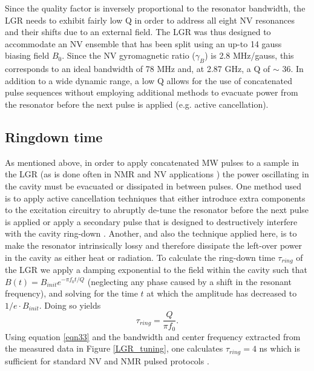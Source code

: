 Since the quality factor is inversely proportional to the resonator bandwidth, the LGR needs to exhibit fairly low Q in order to address all eight NV resonances and their shifts due to an external field. The LGR was thus designed to accommodate an NV ensemble that has been split using an up-to 14 gauss biasing field $B_0$. Since the NV gyromagnetic ratio ($\gamma_B$) is 2.8 MHz/gauss, this corresponds to an ideal bandwidth of 78 MHz and, at 2.87 GHz, a Q of $\sim$ 36. In addition to a wide dynamic range, a low Q allows for the use of concatenated pulse sequences without employing additional methods to evacuate power from the resonator before the next pulse is applied (e.g. active cancellation). 

\subsection{Ringdown time}\label{ringdown}

As mentioned above, in order to apply concatenated MW pulses to a sample in the LGR (as is done often in NMR and NV applications \cite{wang2012comparison, carr1954effects}) the power oscillating in the cavity must be evacuated or dissipated in between pulses. One method used is to apply active cancellation techniques that either introduce extra components to the excitation circuitry to abruptly de-tune the resonator before the next pulse is applied  \cite{peshkovsky2005rf} or apply a secondary pulse that is designed to destructively interfere with the cavity ring-down \cite{Franck2015Active}. Another, and also the technique applied here, is to make the resonator intrinsically lossy and therefore dissipate the left-over power in the cavity as either heat or radiation. To calculate the ring-down time $\tau_{ring}$ of the LGR we apply a damping exponential to the field within the cavity such that $B(t) = B_{init}e^{-\pi f_0t/Q}$ (neglecting any phase caused by a shift in the resonant frequency), and solving for the time $t$ at which the amplitude has decreased to $1/e \cdot B_{init}$. Doing so yields
\begin{equation}\label{eqn33}
\tau_{ring} = \frac{Q}{\pi f_0}.
\end{equation} 
Using equation \ref{eqn33} and the bandwidth and center frequency extracted from the measured data in Figure \ref{LGR_tuning}, one calculates $\tau_{ring} = 4$ ns which is sufficient for standard NV and NMR pulsed protocols \cite{Smeltzer2009Robust,Jelezko2004Observation,Steiner2010Universal}.

